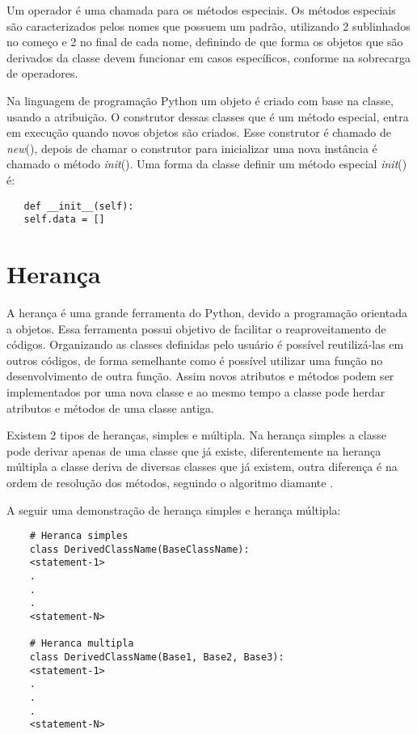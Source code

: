 	Um operador é uma chamada para os métodos especiais. Os métodos especiais são caracterizados pelos nomes que possuem um padrão, utilizando 2 sublinhados no começo e 2 no final de cada nome, definindo de que forma os objetos que são derivados da classe devem funcionar em casos específicos, conforme na sobrecarga de operadores.
	
	 Na linguagem de programação Python um objeto é criado com base na classe, usando a atribuição. O construtor dessas classes que é um método especial, entra em execução quando novos objetos são criados. Esse construtor é chamado de \textunderscore\textunderscore \textit{new}\textunderscore\textunderscore(), depois de chamar o construtor para inicializar uma nova instância é chamado o método \textunderscore\textunderscore \textit{init}\textunderscore\textunderscore(). Uma forma da classe definir um método especial \textunderscore\textunderscore \textit{init}\textunderscore\textunderscore() é:
	 \begin{lstlisting}
   def __init__(self):
   self.data = []
	 \end{lstlisting}
	 
	
    \section{Herança}
	A herança é uma grande ferramenta do Python, devido a programação orientada a objetos. Essa ferramenta possui objetivo de facilitar o reaproveitamento de códigos. Organizando as classes definidas pelo usuário é possível reutilizá-las em outros códigos, de forma semelhante como é possível utilizar uma função no desenvolvimento de outra função. Assim novos atributos e métodos podem ser implementados por uma nova classe e ao mesmo tempo a classe pode herdar atributos e métodos de uma classe antiga.
	
	Existem 2 tipos de heranças, simples e múltipla. Na herança simples a classe pode derivar apenas de uma classe que já existe, diferentemente na herança múltipla a classe deriva de diversas classes que já existem, outra diferença é na ordem de resolução dos métodos, seguindo o algoritmo diamante \cite{Borges2014}.
	
	A seguir uma demonstração de herança simples e herança múltipla: 
	
	\begin{lstlisting}
    # Heranca simples
    class DerivedClassName(BaseClassName):
    <statement-1>
    .
    .
    .
    <statement-N>
		
    # Heranca multipla
    class DerivedClassName(Base1, Base2, Base3):
    <statement-1>
    .
    .
    .
    <statement-N>
	\end{lstlisting}
